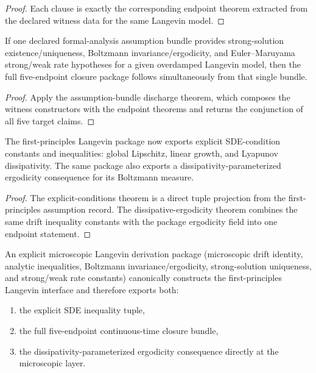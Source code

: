 \begin{proof}
Each clause is exactly the corresponding endpoint theorem extracted from the declared witness data for the same Langevin model.
\end{proof}

\begin{theorem}\label{thm:unified-langevin-assumption-bundle-discharge}
If one declared formal-analysis assumption bundle provides strong-solution existence/uniqueness, Boltzmann invariance/ergodicity, and Euler--Maruyama strong/weak rate hypotheses for a given overdamped Langevin model, then the full five-endpoint closure package follows simultaneously from that single bundle.
\end{theorem}

\begin{proof}
Apply the assumption-bundle discharge theorem, which composes the witness constructors with the endpoint theorems and returns the conjunction of all five target claims.
\end{proof}

\begin{theorem}\label{thm:langevin-explicit-sde-conditions}
The first-principles Langevin package now exports explicit SDE-condition constants and inequalities:
global Lipschitz, linear growth, and Lyapunov dissipativity. The same package also exports a dissipativity-parameterized ergodicity consequence for its Boltzmann measure.
\end{theorem}

\begin{proof}
The explicit-conditions theorem is a direct tuple projection from the first-principles assumption record. The dissipative-ergodicity theorem combines the same drift inequality constants with the package ergodicity field into one endpoint statement.
\end{proof}

\begin{theorem}\label{thm:langevin-microscopic-derivation-constructor}
An explicit microscopic Langevin derivation package (microscopic drift identity, analytic inequalities, Boltzmann invariance/ergodicity, strong-solution uniqueness, and strong/weak rate constants) canonically constructs the first-principles Langevin interface and therefore exports both:
\begin{enumerate}
\item the explicit SDE inequality tuple,
\item the full five-endpoint continuous-time closure bundle,
\item the dissipativity-parameterized ergodicity consequence directly at the microscopic layer.
\end{enumerate}
\end{theorem}

